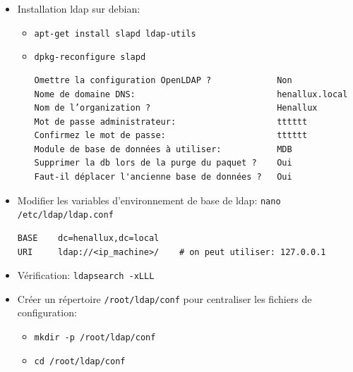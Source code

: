 \documentclass[a4paper]{article}
\begin{document}
\begin{itemize}


\item Installation ldap sur debian:
\begin{example} \begin{itemize}
    \item \texttt{apt-get install slapd ldap-utils}
    \item \texttt{dpkg-reconfigure slapd}
\begin{example} \begin{verbatim}
Omettre la configuration OpenLDAP ?             Non
Nome de domaine DNS:                            henallux.local
Nom de l’organization ?                         Henallux
Mot de passe administrateur:                    tttttt
Confirmez le mot de passe:                      tttttt
Module de base de données à utiliser:           MDB
Supprimer la db lors de la purge du paquet ?    Oui
Faut-il déplacer l'ancienne base de données ?   Oui
\end{verbatim} \end{example}
\end{itemize} \end{example}


\item Modifier les variables d'environnement de base de ldap: \texttt{nano /etc/ldap/ldap.conf}
\begin{example} \begin{verbatim}
BASE    dc=henallux,dc=local
URI     ldap://<ip_machine>/    # on peut utiliser: 127.0.0.1
\end{verbatim} \end{example}


\item Vérification: \texttt{ldapsearch -xLLL}


\item Créer un répertoire \texttt{/root/ldap/conf} pour centraliser les fichiers de configuration:
\begin{example} \begin{itemize}
    \item \texttt{mkdir -p /root/ldap/conf}
    \item \texttt{cd /root/ldap/conf}
\end{itemize} \end{example}



\end{itemize}
\end{document}

